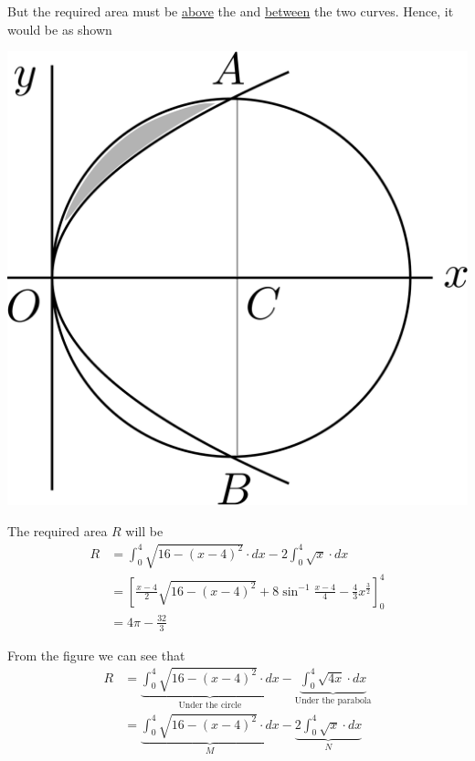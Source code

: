 \documentclass[14pt,fleqn]{extarticle}
\newcommand\expa{16- \left(x-4 \right)^2}
\newcommand\intga{\int_0^4 \sqrt{\expa}\cdot dx}
\newcommand\intgb{2\int_0^4 \sqrt{x}\cdot dx}
\begin{document}
\begin{problem}
\begin{step}
But the required area must be \underline{above} the \xaxis and \underline{between} the two curves. Hence, it would be as shown 

\begin{center}
\includegraphics[scale=0.2]{1381-C.svg}
\end{center}
       
\end{step}

\begin{step}
  \begin{options} 
     \correct 
       
     The required area $R$ will be 
     \smallmath
     \begin{align}
	R &= \intga - \intgb \\
	&= \left[\frac{x-4}{2}\sqrt{\expa} + 8\sin^{-1}\frac{x-4}{4} - \frac{4}{3}x^{\frac{3}{2}}\right]_0^4 \\
	&= 4\pi - \frac{32}{3}
\end{align}

  
    \end{options} 
     \reason 
     
     From the figure we can see that 
     \smallmath
     \begin{align}
     R &= \underbrace{\intga}_{\text{Under the circle}} - \underbrace{\int_0^4 \sqrt{4x}\cdot dx}_{\text{Under the parabola}} \\
     &= \underbrace{\intga}_M - \underbrace{\intgb}_N
\end{align}


\end{step}
\end{problem}
\end{document}
